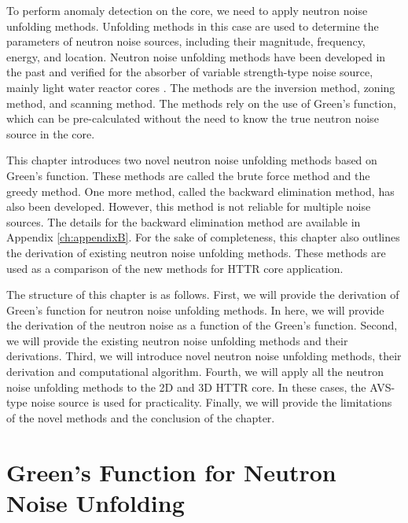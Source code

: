 \label{ch:unfolding_methods}

To perform anomaly detection on the core, we need to apply neutron noise unfolding methods. Unfolding methods in this case are used to determine the parameters of neutron noise sources, including their magnitude, frequency, energy, and location. Neutron noise unfolding methods have been developed in the past and verified for the absorber of variable strength-type noise source, mainly light water reactor cores \cite{karlssonLocalizationChannelInstability1999, demaziereDevelopmentNonintrusiveMethod2002, demaziereIdentificationLocalizationAbsorbers2005}. The methods are the inversion method, zoning method, and scanning method. The methods rely on the use of Green’s function, which can be pre-calculated without the need to know the true neutron noise source in the core.

This chapter introduces two novel neutron noise unfolding methods based on Green’s function. These methods are called the brute force method and the greedy method. One more method, called the backward elimination method, has also been developed. However, this method is not reliable for multiple noise sources. The details for the backward elimination method are available in Appendix \ref{ch:appendixB}. For the sake of completeness, this chapter also outlines the derivation of existing neutron noise unfolding methods. These methods are used as a comparison of the new methods for HTTR core application.

The structure of this chapter is as follows. First, we will provide the derivation of Green’s function for neutron noise unfolding methods. In here, we will provide the derivation of the neutron noise as a function of the Green’s function. Second, we will provide the existing neutron noise unfolding methods and their derivations. Third, we will introduce novel neutron noise unfolding methods, their derivation and computational algorithm. Fourth, we will apply all the neutron noise unfolding methods to the 2D and 3D HTTR core. In these cases, the AVS-type noise source is used for practicality. Finally, we will provide the limitations of the novel methods and the conclusion of the chapter.

\section{Green's Function for Neutron Noise Unfolding}


